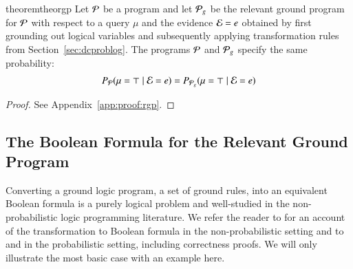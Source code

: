 \begin{restatable}{theorem}{theorgp}
	\label{theo:rgp}
	Let $\mathcal{P}$ be a \dcproblogsty program and let $\mathcal{P}_g$ be the relevant ground program for $\mathcal{P}$ with respect to a query $\mu$ and the evidence $\mathcal{E}=e$ obtained by first grounding out logical variables and subsequently applying transformation rules from Section~\ref{sec:dcproblog}. The programs $\mathcal{P}$ and $\mathcal{P}_g$ specify the same probability:
	\begin{align}
		P_{\mathcal{P}}(\mu=\top \mid \mathcal{E}=e)
		=
		P_{\mathcal{P}_g}(\mu=\top \mid \mathcal{E}=e)
	\end{align}
    \end{restatable}

    \begin{proof}
        See Appendix~\ref{app:proof:rgp}.
        \end{proof}

\subsection{The Boolean Formula for the Relevant Ground Program}
\label{sec:relprog2boolfrom}

Converting a ground logic program, \ie a set of ground rules, into an equivalent Boolean formula is a purely logical problem and well-studied in the non-probabilistic logic programming literature. We refer the reader to \citet{janhunen2004representing} for an account of the transformation to Boolean formula in the non-probabilistic setting and to \citet{mantadelis2010dedicated} and \citet{fierens2015inference} in the probabilistic setting,
including correctness proofs. We will only illustrate the most basic case with an example here.


